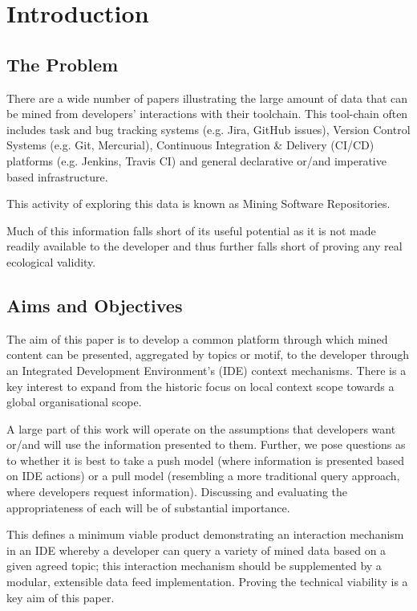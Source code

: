 \chapter{Introduction}

\section{The Problem}

\normalfont There are a wide number of papers illustrating the large amount of data that can be mined from developers' interactions with their toolchain. This tool-chain often includes task and bug tracking systems (e.g. Jira, GitHub issues), Version Control Systems (e.g. Git, Mercurial), Continuous Integration \& Delivery (CI/CD) platforms (e.g. Jenkins, Travis CI) and general declarative or/and imperative based infrastructure.

This activity of exploring this data is known as Mining Software Repositories.

Much of this information falls short of its useful potential as it is not made readily available to the developer and thus further falls short of proving any real ecological validity.

\section{Aims and Objectives}

The aim of this paper is to develop a common platform through which mined content can be presented, aggregated by topics or motif, to the developer through an Integrated Development Environment's (IDE) context mechanisms. There is a key interest to expand from the historic focus on local context scope towards a global organisational scope.

A large part of this work will operate on the assumptions that developers want or/and will use the information presented to them. Further, we pose questions as to whether it is best to take a push model (where information is presented based on IDE actions) or a pull model (resembling a more traditional query approach, where developers request information). Discussing and evaluating the appropriateness of each will be of substantial importance. 

This defines a minimum viable product demonstrating an interaction mechanism in an IDE whereby a developer can query a variety of mined data based on a given agreed topic; this interaction mechanism should be supplemented by a modular, extensible data feed implementation. Proving the technical viability is a key aim of this paper. 